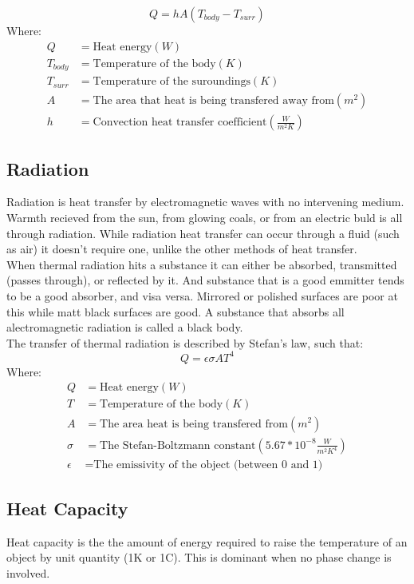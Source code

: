 \documentclass[a4paper, 12pt]{article}
\begin{document}
\pagebreak

		\[ Q = hA(T_{body}-T_{surr}) \]
		Where:
		\begin{align*}
			Q &= \text{Heat energy} (W) \\
			T_{body} &= \text{Temperature of the body} (K) \\
			T_{surr} &= \text{Temperature of the suroundings} (K) \\
			A &= \text{The area that heat is being transfered away from} (m^2) \\
			h &= \text{Convection heat transfer coefficient} (\frac{W}{m^2 K})
		\end{align*}		
		
	\subsection{Radiation}	
		Radiation is heat transfer by electromagnetic waves with no intervening medium. Warmth recieved from the sun, from glowing coals, or from an electric buld is all through radiation.  While radiation heat transfer can occur through a fluid (such as air) it doesn't require one, unlike the other methods of heat transfer. \\
		When thermal radiation hits a substance it can either be absorbed, transmitted (passes through), or reflected by it. And substance that is a good emmitter tends to be a good absorber, and visa versa. Mirrored or polished surfaces are poor at this while matt black surfaces are good. A substance that absorbs all alectromagnetic radiation is called a black body.\\
		The transfer of thermal radiation is described by Stefan's law, such that:
		\[Q = \epsilon \sigma AT^4 \]
		Where:
		\begin{align*}
			Q &= \text{Heat energy} (W) \\
			T &= \text{Temperature of the body} (K) \\
			A &= \text{The area heat is being transfered from} (m^2) \\
			\sigma &= \text{The Stefan-Boltzmann constant} (5.67*10^{-8} \frac{W}{m^2 K^4}) \\
			\epsilon &= \text{The emissivity of the object (between 0 and 1)}
		\end{align*}
				
	\subsection{Heat Capacity}
		Heat capacity is the the amount of energy required to raise the temperature of an object by unit quantity (1K or 1\degree C). This is dominant when no phase change is involved. \\
\end{document}
